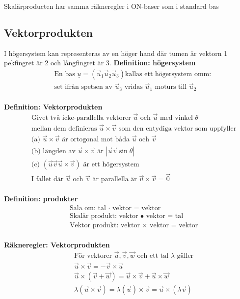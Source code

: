 Skalärproducten har samma räkneregler i ON-baser som i standard bas


\subsection{Vektorprodukten}
I högersystem kan representeras av en höger hand där tumen är vektorn 1 pekfingret är 2
och långfingret är 3.
\textbf{Definition: högersystem}
\begin{align*} 
  &\quad  \text{En bas $\underline{u} = (\vec{u}_1 \vec{u}_2 \vec{u}_3)$
    kallas ett högersystem omm: } \\
  &\quad  \text{set ifrån spetsen av $\vec{u}_3$ vridas $\vec{u}_1$ moturs till $\vec{u}_2$} \\
\end{align*}

\textbf{Definition: Vektorprodukten}
\begin{align*} 
  &\quad  \text{Givet två icke-parallella vektorer $\vec{u}$ och $\vec{u}$ med vinkel $\theta$} \\
  &\quad  \text{mellan dem definieras $\vec{u}\times\vec{v}$ som den entydiga vektor som uppfyller} \\
  &\quad  \text{(a) } \vec{u}\times\vec{v} \text{ är ortogonal mot båda $\vec{u}$ och $\vec{v}$}  \\
  &\quad  \text{(b) längden av } \vec{u}\times\vec{v} \text{ är } |\vec{u}\vec{v}\sin{\theta}| \\
  &\quad  \text{(c) } (\vec{u} \vec{v} \vec{u}\times\vec{v}) \text{ är ett högersystem} \\
  &\quad  \text{I fallet där $\vec{u}$ och $\vec{v}$ är parallella är }
  \vec{u}\times\vec{v}=\vec{0} \\
\end{align*}

\textbf{Definition: produkter}
\begin{align*} 
  &\quad  \text{Sala om: tal $\cdot$ vektor = vektor} \\
  &\quad  \text{Skalär produkt: vektor $\bullet$ vektor = tal} \\
  &\quad  \text{Vektor produkt: vektor $\times$ vektor = vektor} \\
\end{align*}

\textbf{Räkneregler: Vektorprodukten }
\begin{align*} 
  &\quad  \text{För vektorer $\vec{u},\vec{v},\vec{w}$ och ett tal $\lambda$ gäller} \\
  &\quad  \vec{u}\times\vec{v}=-\vec{v}\times\vec{u} \\
  &\quad  \vec{u}\times(\vec{v}+\vec{w}) = \vec{u}\times\vec{v}+\vec{u}\times\vec{w}  \\
  &\quad  \lambda(\vec{u}\times\vec{v}) = \lambda(\vec{u})\times\vec{v}
  = \vec{u}\times(\lambda\vec{v}) \\
\end{align*}


